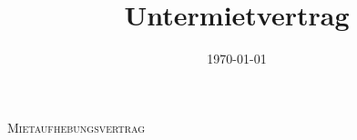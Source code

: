 





\setlength\parindent{0pt}

\makeatletter
\newcommand \MYdotfill {{\color{gray} \leavevmode \cleaders \hb@xt@ .33em{\hss .\hss }\hfill \kern \z@}}
\makeatother


\title{Untermietvertrag}
\author{}
\date{\today}







\fancyfoot[C]{\footnotesize{\thepage}}

{\Huge \textsc{Mietaufhebungsvertrag}}

\vspace{2cm}



\vspace{-6ex}


\pagebreak

\renewcommand{\headrulewidth}{0.4pt}





